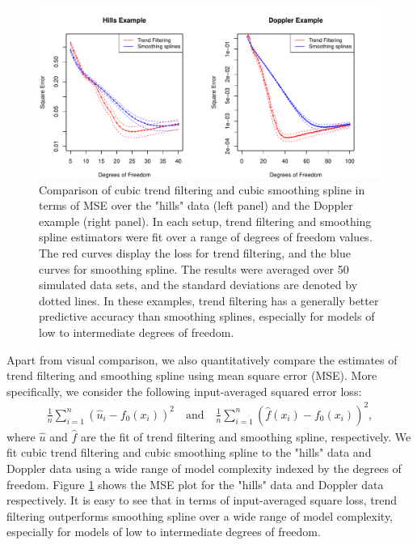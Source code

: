 \documentclass[a4paper]{article}
\begin{document}
\begin{figure}[t!]
\centering
\includegraphics[width = 1\textwidth]{Figures/Figure6.pdf}
\caption{Comparison of cubic trend filtering and cubic smoothing spline in terms of MSE over the "hills" data (left panel) and the Doppler example (right panel). In each setup, trend filtering and smoothing spline estimators were fit over a range of degrees of freedom values. The red curves display the loss for trend filtering, and the blue curves for smoothing spline. The results were averaged over 50 simulated data sets, and the standard deviations are denoted by dotted lines. In these examples, trend filtering has a generally better predictive accuracy than smoothing splines, especially for models of low to intermediate degrees of freedom.}
\label{fig:Figure6_mse}
\end{figure}

Apart from visual comparison, we also quantitatively compare the estimates of trend filtering and smoothing spline using mean square error (MSE). More specifically, we consider the following input-averaged squared error loss:
\begin{align*}
\frac{1}{n}\sum_{i=1}^n (\hat{u}_i - f_0(x_i))^2 \quad \text{and}\quad \frac{1}{n}\sum_{i=1}^n (\hat{f}(x_i) - f_0(x_i))^2,
\end{align*}
where $\hat{u}$ and $\hat{f}$ are the fit of trend filtering and smoothing spline, respectively. We fit cubic trend filtering and cubic smoothing spline to the "hills" data and Doppler data using a wide range of model complexity indexed by the degrees of freedom. Figure \ref{fig:Figure6_mse} shows the MSE plot for the "hills" data and Doppler data respectively. It is easy to see that in terms of input-averaged square loss, trend filtering outperforms smoothing spline over a wide range of model complexity, especially for models of low to intermediate degrees of freedom. 
\end{document}
